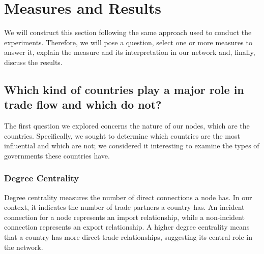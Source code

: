 \documentclass[12pt, a4paper]{article}
\begin{document}
\section{Measures and Results}
\label{measures}

We will construct this section following the same approach used to conduct the experiments. Therefore, we will pose a question, select one or more measures to answer it, explain the measure and its interpretation in our network and, finally, discuss the results.

\subsection{Which kind of countries play a major role in trade flow and which do not?}

The first question we explored concerns the nature of our nodes, which are the countries. Specifically, we sought to determine which countries are the most influential and which are not; we considered it interesting to examine the types of governments these countries have.

\subsubsection{Degree Centrality}

Degree centrality measures the number of direct connections a node has. In our context, it indicates the number of trade partners a country has. An incident connection for a node represents an import relationship, while a non-incident connection represents an export relationship. A higher degree centrality means that a country has more direct trade relationships, suggesting its central role in the network.\\
\end{document}
